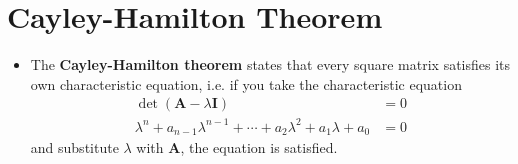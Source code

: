 \documentclass{article}
\renewcommand{\vec}[1]{\boldsymbol{\mathbf{#1}}}
\begin{document}
\setcounter{section}{9}
\section{Cayley-Hamilton Theorem}

\begin{itemize}
  \item The \textbf{Cayley-Hamilton theorem} states that every square matrix satisfies its own characteristic equation, i.e. if you take the characteristic equation \begin{align*}
          \det (\vec{A} - \lambda \vec{I})                                                   & = 0 \\
          \lambda^n + a_{n - 1} \lambda^{n - 1} + \cdots + a_2 \lambda^2 + a_1 \lambda + a_0 & = 0
        \end{align*} and substitute $\lambda$ with $\vec{A}$, the equation is satisfied.
\end{itemize}
\end{document}
